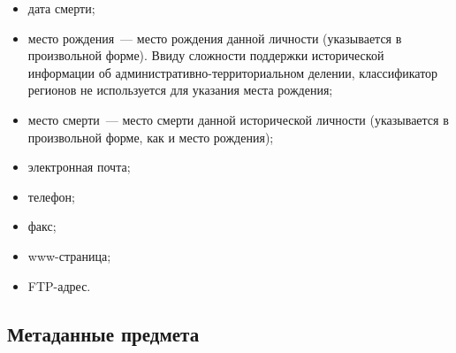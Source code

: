 \begin{multicols}{2}
\begin{itemize}
\item дата смерти;\\[-14pt]
\item место рождения~--- место рождения данной личности (указывается в произвольной форме). Ввиду 
сложности поддержки исторической информации об ад\-ми\-ни\-стра\-тив\-но-тер\-ри\-то\-ри\-аль\-ном 
делении, классификатор регионов не используется для указания места рождения; \\[-14pt]
\item место смерти~--- место смерти данной исторической личности (указывается в произвольной 
форме, как и место рождения);\\[-14pt]
\item электронная почта;\\[-14pt]
\item телефон;\\[-14pt]
\item факс;\\[-14pt]
\item www-страница;\\[-14pt]
\item FTP-адрес.
\end{itemize}

\vspace*{-6pt}
  
  \subsection*{Метаданные предмета}
  

\end{multicols}
